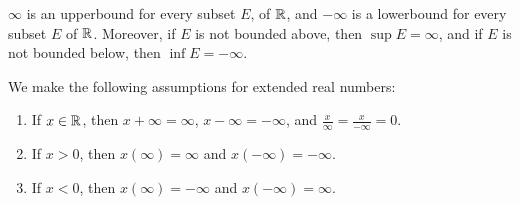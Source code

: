 \begin{lemma}\label{1.3.5}
    $\infty$ is an upperbound for every subset  $E$, of  $\mathbb{R}$, and  $-\infty$ is a lowerbound 
    for every subset  $E$ of  $\mathbb{R}$. Moreover, if $E$ is not bounded above, then  $\sup{E}=\infty$, 
    and if  $E$ is not bounded below, then  $\inf{E}=-\infty$.
\end{lemma}

\begin{remark}
    We make the following assumptions for extended real numbers:
        \begin{enumerate}[label=(\arabic*)]
            \item If $x \in \mathbb{R}$, then  $x+\infty=\infty$, $x-\infty=-\infty$, and  $ \frac{x}{\infty}=\frac{x}{-\infty}=0$.

            \item If $x>0$, then  $x(\infty)=\infty$ and  $x(-\infty)=-\infty$.

            \item If  $x<0$, then  $x(\infty)=-\infty$ and  $x(-\infty)=\infty$.
        \end{enumerate}
\end{remark}
